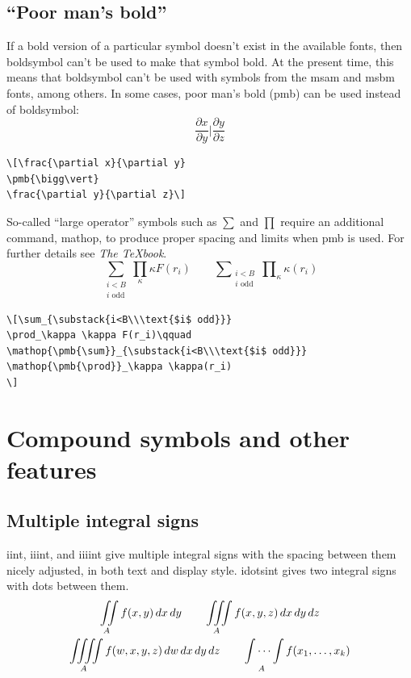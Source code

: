 \documentclass{article}
\newcommand{\ntt}{\normalfont\ttfamily}
\newcommand{\cn}[1]{{\protect\ntt\bslash#1}}
\newcommand{\fn}[1]{{\protect\ntt#1}}
\theoremstyle{definition}
\theoremstyle{remark}
\begin{document}
\subsection{``Poor man's bold''}
If a bold version of a particular symbol doesn't exist in the
available fonts,
then \cn{boldsymbol} can't be used to make that symbol bold.
At the present time, this means that
\cn{boldsymbol} can't be used with symbols from
the \fn{msam} and \fn{msbm} fonts, among others.
In some cases, poor man's bold (\cn{pmb}) can be used instead
of \cn{boldsymbol}:
\[\frac{\partial x}{\partial y}
\pmb{\bigg\vert}
\frac{\partial y}{\partial z}\]
\begin{verbatim}
\[\frac{\partial x}{\partial y}
\pmb{\bigg\vert}
\frac{\partial y}{\partial z}\]
\end{verbatim}
So-called ``large operator'' symbols such as $\sum$ and $\prod$
require an additional command, \cn{mathop},
to produce proper spacing and limits when \cn{pmb} is used.
For further details see \textit{The \TeX book}.
\[\sum_{\substack{i<B\\\text{$i$ odd}}}
\prod_\kappa \kappa F(r_i)\qquad
\mathop{\pmb{\sum}}_{\substack{i<B\\\text{$i$ odd}}}
\mathop{\pmb{\prod}}_\kappa \kappa(r_i)
\]
\begin{verbatim}
\[\sum_{\substack{i<B\\\text{$i$ odd}}}
\prod_\kappa \kappa F(r_i)\qquad
\mathop{\pmb{\sum}}_{\substack{i<B\\\text{$i$ odd}}}
\mathop{\pmb{\prod}}_\kappa \kappa(r_i)
\]
\end{verbatim}

\section{Compound symbols and other features}
\label{s:comp}
\subsection{Multiple integral signs}

\cn{iint}, \cn{iiint}, and \cn{iiiint} give multiple integral signs
with the spacing between them nicely adjusted,  in both text and
display style.  \cn{idotsint} gives two integral signs with dots
between them.
\begin{gather}
\iint\limits_A f(x,y)\,dx\,dy\qquad\iiint\limits_A
f(x,y,z)\,dx\,dy\,dz\\
\iiiint\limits_A
f(w,x,y,z)\,dw\,dx\,dy\,dz\qquad\idotsint\limits_A f(x_1,\dots,x_k)
\end{gather}
\end{document}
